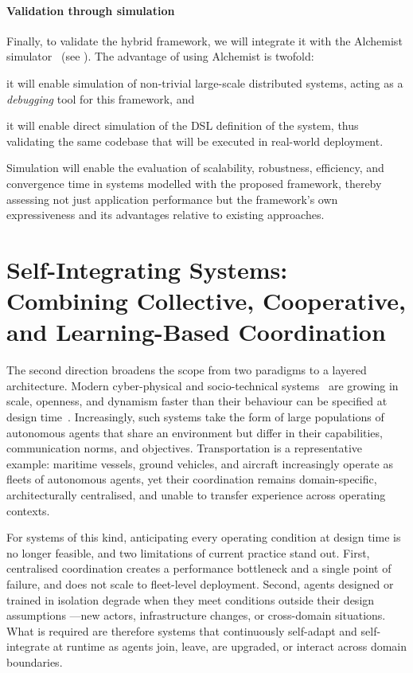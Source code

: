 \paragraph{Validation through simulation}
Finally,
to validate the hybrid framework,
we will integrate it with the Alchemist simulator~\cite{PianiniJOS2013}
(see ).
%
The advantage of using Alchemist is twofold:
\begin{inlinelist}
    \item it will enable simulation of non-trivial large-scale distributed systems,
    acting as a \emph{debugging} tool for this framework, and
    \item it will enable direct simulation of the \ac{DSL} definition of the system,
    thus validating the same codebase that will be executed in real-world deployment.
\end{inlinelist}
%
Simulation will enable the evaluation of
scalability,
robustness,
efficiency,
and convergence time
in systems modelled with the proposed framework,
thereby assessing not just application performance
but the framework's own expressiveness and its advantages relative to existing approaches.

\section{Self-Integrating Systems: Combining Collective, Cooperative, and Learning-Based Coordination}
\label{sec:perspectives-sissy}

The second direction broadens the scope from two paradigms to a layered architecture.
%
Modern cyber-physical
and
socio-technical systems~\cite{ZENG20201028} are growing in
scale, openness, and dynamism
faster than their behaviour can be specified at design time~\cite{Sztipanovits03072019}.
%
Increasingly,
such systems take the form of
large populations of autonomous agents
that
share an environment but differ in
their capabilities,
communication norms,
and
objectives.
%
Transportation is a representative example:
maritime vessels, ground vehicles, and aircraft
increasingly operate as fleets of autonomous agents,
yet
their coordination remains
domain-specific,
architecturally centralised,
and
unable to transfer experience across operating contexts.

For systems of this kind,
anticipating every operating condition at design time
is no longer feasible,
and
two limitations of current practice stand out.
%
First,
centralised coordination creates a performance bottleneck
and
a single point of failure,
and
does not scale to fleet-level deployment.
%
Second,
agents designed or trained in isolation degrade when
they meet conditions outside their design assumptions%
---new actors, infrastructure changes, or cross-domain situations.
%
What is required are therefore
systems that continuously
self-adapt and self-integrate at runtime as agents
join, leave, are upgraded, or interact across domain boundaries.

